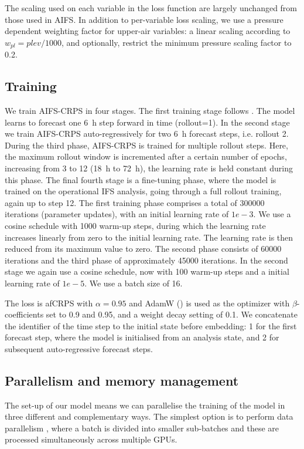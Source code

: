 \documentclass{article}
\begin{document}
The scaling used on each variable in the loss function are largely unchanged from those used in AIFS. In addition to per-variable loss scaling, we use a pressure dependent weighting factor for upper-air variables: a linear scaling according to $w_{pl} = plev/1000$, and optionally, restrict the minimum pressure scaling factor to 0.2.

\subsection{Training}
We train AIFS-CRPS in four stages. The first training stage follows \cite{lam2022graphcast}. The model learns to forecast one 6~h step forward in time (rollout=1). In the second stage we train AIFS-CRPS auto-regressively for two 6~h forecast steps, i.e. rollout 2. During the third phase, AIFS-CRPS is trained for multiple rollout steps. Here, the maximum rollout window is incremented after a certain number of epochs, increasing from 3 to 12 (18~h to 72~h), the learning rate is held constant during this phase. The final fourth stage is a fine-tuning phase, where the model is trained on the operational IFS analysis, going through a full rollout training, again up to step 12. The first training phase comprises a total of \num{300000} iterations (parameter updates), with an initial learning rate of $1e-3$. We use a cosine schedule with 1000 warm-up steps, during which the learning rate increases linearly from zero to the initial learning rate. The learning rate is then reduced from its maximum value to zero. The second phase consists of \num{60000} iterations and the third phase of approximately \num{45000} iterations. In the second stage we again use a cosine schedule, now with 100 warm-up steps and a initial learning rate of $1e-5$. We use a batch size of 16.

The loss is afCRPS with $\alpha=0.95$ and AdamW (\cite{loshchilov2018decoupled}) is used as the optimizer with $\beta$-coefficients set to 0.9 and 0.95, and a weight decay setting of 0.1. We concatenate the identifier of the time step to the initial state before embedding: 1 for the first forecast step, where the model is initialised from an analysis state, and 2 for subsequent auto-regressive forecast steps.

\subsection{Parallelism and memory management}\label{sec:parallelism}
The set-up of our model means we can parallelise the training of the model in three different and complementary ways. The simplest option is to perform data parallelism \citep{li2020ddp}, where a batch is divided into smaller sub-batches and these are processed simultaneously across multiple GPUs. 
\end{document}
